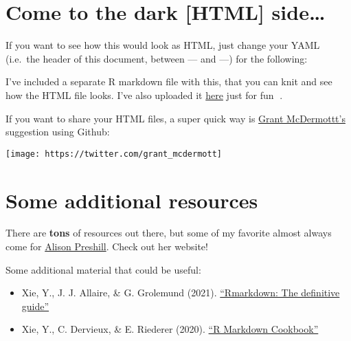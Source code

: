 \documentclass[
]{article}
\begin{document}
\hypertarget{come-to-the-dark-html-side}{%
\section{Come to the dark {[}HTML{]}
side\ldots{}}\label{come-to-the-dark-html-side}}

If you want to see how this would look as HTML, just change your YAML
(i.e.~the header of this document, between --- and ---) for the
following:

I've included a separate R markdown file with this, that you can knit
and see how the HTML file looks. I've also uploaded it \href{}{here}
just for fun 🥳.

If you want to share your HTML files, a super quick way is
\href{https://twitter.com/grant_mcdermott}{Grant McDermottt's}
suggestion using Github:

\texttt{[image: https://twitter.com/grant\_mcdermott]}

\hypertarget{some-additional-resources}{%
\section{Some additional resources}\label{some-additional-resources}}

There are \textbf{tons} of resources out there, but some of my favorite
almost always come for \href{https://twitter.com/apreshill}{Alison
Preshill}. Check out her website!

Some additional material that could be useful:

\begin{itemize}
\item
  Xie, Y., J. J. Allaire, \& G. Grolemund (2021).
  \href{https://bookdown.org/yihui/rmarkdown/}{``Rmarkdown: The
  definitive guide''}
\item
  Xie, Y., C. Dervieux, \& E. Riederer (2020).
  \href{https://bookdown.org/yihui/rmarkdown-cookbook/}{``R Markdown
  Cookbook''}
\end{itemize}
\end{document}
